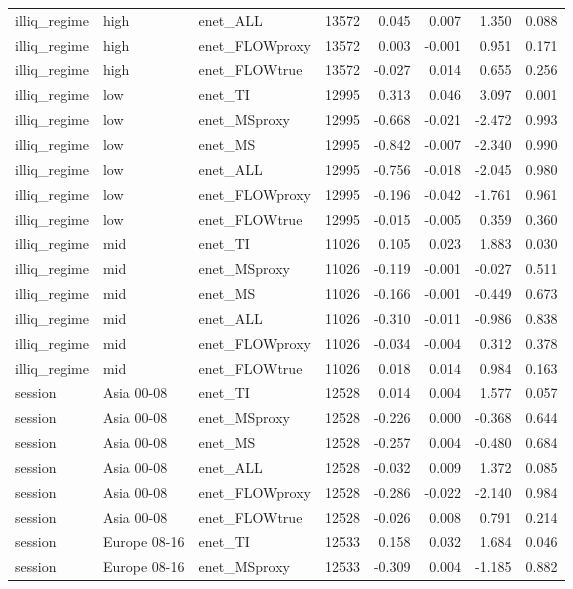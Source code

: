 \begin{tabular}{lllrrrrr}
illiq_regime & high & enet_ALL & 13572 & 0.045 & 0.007 & 1.350 & 0.088 \\
illiq_regime & high & enet_FLOWproxy & 13572 & 0.003 & -0.001 & 0.951 & 0.171 \\
illiq_regime & high & enet_FLOWtrue & 13572 & -0.027 & 0.014 & 0.655 & 0.256 \\
illiq_regime & low & enet_TI & 12995 & 0.313 & 0.046 & 3.097 & 0.001 \\
illiq_regime & low & enet_MSproxy & 12995 & -0.668 & -0.021 & -2.472 & 0.993 \\
illiq_regime & low & enet_MS & 12995 & -0.842 & -0.007 & -2.340 & 0.990 \\
illiq_regime & low & enet_ALL & 12995 & -0.756 & -0.018 & -2.045 & 0.980 \\
illiq_regime & low & enet_FLOWproxy & 12995 & -0.196 & -0.042 & -1.761 & 0.961 \\
illiq_regime & low & enet_FLOWtrue & 12995 & -0.015 & -0.005 & 0.359 & 0.360 \\
illiq_regime & mid & enet_TI & 11026 & 0.105 & 0.023 & 1.883 & 0.030 \\
illiq_regime & mid & enet_MSproxy & 11026 & -0.119 & -0.001 & -0.027 & 0.511 \\
illiq_regime & mid & enet_MS & 11026 & -0.166 & -0.001 & -0.449 & 0.673 \\
illiq_regime & mid & enet_ALL & 11026 & -0.310 & -0.011 & -0.986 & 0.838 \\
illiq_regime & mid & enet_FLOWproxy & 11026 & -0.034 & -0.004 & 0.312 & 0.378 \\
illiq_regime & mid & enet_FLOWtrue & 11026 & 0.018 & 0.014 & 0.984 & 0.163 \\
session & Asia 00-08 & enet_TI & 12528 & 0.014 & 0.004 & 1.577 & 0.057 \\
session & Asia 00-08 & enet_MSproxy & 12528 & -0.226 & 0.000 & -0.368 & 0.644 \\
session & Asia 00-08 & enet_MS & 12528 & -0.257 & 0.004 & -0.480 & 0.684 \\
session & Asia 00-08 & enet_ALL & 12528 & -0.032 & 0.009 & 1.372 & 0.085 \\
session & Asia 00-08 & enet_FLOWproxy & 12528 & -0.286 & -0.022 & -2.140 & 0.984 \\
session & Asia 00-08 & enet_FLOWtrue & 12528 & -0.026 & 0.008 & 0.791 & 0.214 \\
session & Europe 08-16 & enet_TI & 12533 & 0.158 & 0.032 & 1.684 & 0.046 \\
session & Europe 08-16 & enet_MSproxy & 12533 & -0.309 & 0.004 & -1.185 & 0.882 \\

\end{tabular}
